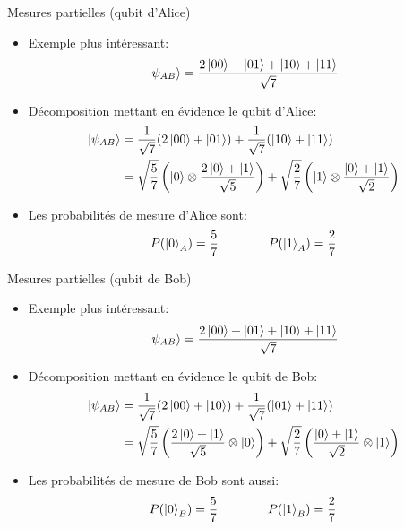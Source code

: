 \documentclass[aspectratio=169,12pt]{beamer}
\begin{document}
\begin{frame}{Mesures partielles (qubit d'Alice)}
  \begin{itemize}[<+->]
    \item Exemple plus intéressant:
    \begin{equation*}
      \ket{\psi_{AB}} = \frac{2\ket{00} + \ket{01} + \ket{10} + \ket{11}}{\sqrt{7}}
    \end{equation*}
    \item Décomposition mettant en évidence le qubit d'Alice:
    \begin{align*}
      \ket{\psi_{AB}} 
      &= \frac{1}{\sqrt{7}} (2\ket{00} + \ket{01}) + \frac{1}{\sqrt{7}} (\ket{10} + \ket{11})\\
      &= \sqrt{\frac{5}{7}} \left( \ket{0} \otimes \frac{2\ket{0}+\ket{1}}{\sqrt{5}} \right) + \sqrt{\frac{2}{7}} \left( \ket{1} \otimes \frac{\ket{0}+\ket{1}}{\sqrt{2}} \right)
    \end{align*}
    \item Les probabilités de mesure d'Alice sont:
    \begin{equation*}
      P(\ket{0}_A) = \frac{5}{7} \qquad\qquad P(\ket{1}_A) = \frac{2}{7}
    \end{equation*}
  \end{itemize}
\end{frame}

\begin{frame}{Mesures partielles (qubit de Bob)}
  \begin{itemize}
    \item Exemple plus intéressant:
    \begin{equation*}
      \ket{\psi_{AB}} = \frac{2\ket{00} + \ket{01} + \ket{10} + \ket{11}}{\sqrt{7}}
    \end{equation*}
    \item Décomposition mettant en évidence le qubit de Bob:
    \begin{align*}
      \ket{\psi_{AB}} 
      &= \frac{1}{\sqrt{7}} (2\ket{00} + \ket{10}) + \frac{1}{\sqrt{7}} (\ket{01} + \ket{11})\\
      &= \sqrt{\frac{5}{7}} \left( \frac{2\ket{0}+\ket{1}}{\sqrt{5}} \otimes \ket{0} \right) + \sqrt{\frac{2}{7}} \left( \frac{\ket{0}+\ket{1}}{\sqrt{2}} \otimes \ket{1} \right)
    \end{align*}
    \item Les probabilités de mesure de Bob sont aussi:
    \begin{equation*}
      P(\ket{0}_B) = \frac{5}{7} \qquad\qquad P(\ket{1}_B) = \frac{2}{7}
    \end{equation*}
  \end{itemize}
\end{frame}
\end{document}
